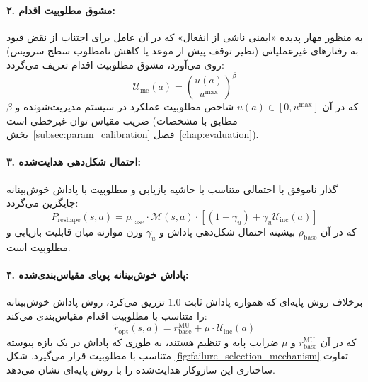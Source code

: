 \documentclass[oneside,openany,phd]{TMU-Thesis}
\begin{document}
\paragraph{۲. مشوق مطلوبیت اقدام:}
به منظور مهار پدیده «ایمنی ناشی از انفعال» که در آن عامل برای اجتناب از نقض قیود به رفتارهای غیرعملیاتی (نظیر توقف پیش از موعد یا کاهش نامطلوب سطح سرویس) روی می‌آورد، مشوق مطلوبیت اقدام تعریف می‌گردد:
\begin{equation}
\label{eq:utility_incentive}
\mathcal{U}_{\text{inc}}(a) = \left( \frac{u(a)}{u^{\max}} \right)^\beta
\end{equation}
که در آن $u(a) \in [0, u^{\max}]$ شاخص مطلوبیت عملکرد در سیستم مدیریت‌شونده و $\beta$ ضریب مقیاس توان غیرخطی است (مطابق با مشخصات بخش~\ref{subsec:param_calibration} فصل~\ref{chap:evaluation}).

\paragraph{۳. احتمال شکل‌دهی هدایت‌شده:}
گذار ناموفق با احتمالی متناسب با حاشیه بازیابی و مطلوبیت با پاداش خوش‌بینانه جایگزین می‌گردد:
\begin{equation}
\label{eq:guided_prob}
P_{\text{reshape}}(s, a) = \rho_{\text{base}} \cdot \mathcal{M}(s, a) \cdot \left[ (1 - \gamma_u) + \gamma_u \mathcal{U}_{\text{inc}}(a) \right]
\end{equation}
که در آن $\rho_{\text{base}}$ بیشینه احتمال شکل‌دهی پاداش و $\gamma_u$ وزن موازنه میان قابلیت بازیابی و مطلوبیت است.

\paragraph{۴. پاداش خوش‌بینانه پویای مقیاس‌بندی‌شده:}
برخلاف روش پایه‌ای که همواره پاداش ثابت $1.0$ تزریق می‌کرد، روش \mursdrl پاداش خوش‌بینانه را متناسب با مطلوبیت اقدام مقیاس‌بندی می‌کند:
\begin{equation}
\label{eq:dynamic_ropt}
\tilde{r}_{\text{opt}}(s, a) = r_{\text{base}}^{\text{MU}} + \mu \cdot \mathcal{U}_{\text{inc}}(a)
\end{equation}
که در آن $r_{\text{base}}^{\text{MU}}$ و $\mu$ ضرایب پایه و تنظیم هستند، به طوری که پاداش در یک بازه پیوسته متناسب با مطلوبیت قرار می‌گیرد. شکل \ref{fig:failure_selection_mechanism} تفاوت ساختاری این سازوکار هدایت‌شده را با روش پایه‌ای نشان می‌دهد.
\end{document}
